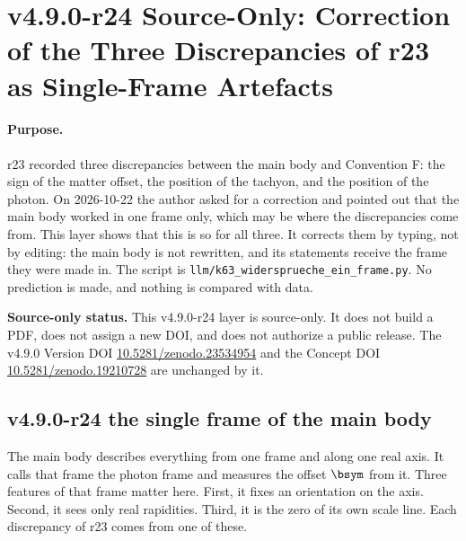 \clearpage
\section*{v4.9.0-r24 Source-Only: Correction of the Three Discrepancies of r23 as Single-Frame Artefacts}
\label{sec:v490-r24-single-frame-correction}

\paragraph{Purpose.}
r23 recorded three discrepancies between the main body and Convention F: the sign of the matter offset, the position of the
tachyon, and the position of the photon.  On 2026-10-22 the author asked for a correction and pointed out that the main body
worked in one frame only, which may be where the discrepancies come from.  This layer shows that this is so for all three.  It
corrects them by typing, not by editing: the main body is not rewritten, and its statements receive the frame they were made
in.  The script is \texttt{llm/k63\_widersprueche\_ein\_frame.py}.  No prediction is made, and nothing is compared with data.

\noindent\textbf{Source-only status.}
This v4.9.0-r24 layer is source-only.  It does not build a PDF, does not assign a new DOI,
and does not authorize a public release.  The v4.9.0 Version DOI
\href{https://doi.org/10.5281/zenodo.23534954}{10.5281/zenodo.23534954} and the Concept DOI
\href{https://doi.org/10.5281/zenodo.19210728}{10.5281/zenodo.19210728} are unchanged by it.

\subsection*{v4.9.0-r24 the single frame of the main body}
\label{subsec:v490-r24-single-frame}

The main body describes everything from one frame and along one real axis.  It calls that frame the photon frame and measures
the offset \(\bsym\) from it.  Three features of that frame matter here.  First, it fixes an orientation on the axis.  Second, it
sees only real rapidities.  Third, it is the zero of its own scale line.  Each discrepancy of r23 comes from one of these.

